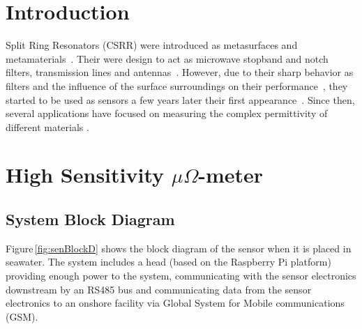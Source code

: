 \documentclass[journal,twoside,web]{ieeecolor}
\begin{document}
\maketitle

\section{Introduction}
\label{sec:intro}
 Split Ring Resonators (CSRR) were introduced as metasurfaces and metamaterials~\cite{falcone2004, Baena2005}. Their were design to act as microwave stopband and notch filters, transmission lines and antennas~\cite{GGarcia2005, Bonache2006, Mandal2006, Gil2007, Velez2008, Zhang2009}. However, due to their sharp behavior as filters and the influence of the surface surroundings on their performance~\cite{Grzegorczyk2005, Stevanovic2006, Bonache2006}, they started to be used as sensors a few years later their first appearance~\cite{Boybay2012, Song2013, Lee2014, Lee2014_2, Ansari2015, Standaert2017, Su2019}. Since then, several applications have focused on measuring the complex permittivity of different materials \cite{} .

\section{High Sensitivity $\mu\Omega$-meter}
\label{sec:corrsens}
\subsection{System Block Diagram}
\label{ssec:sysBlockD}
Figure\,\ref{fig:senBlockD} shows the block diagram of the sensor when it is placed in seawater. The system includes a head (based on the Raspberry Pi platform) providing enough power to the system, communicating with the sensor electronics downstream by an RS485 bus and communicating data from the sensor electronics to an onshore facility via Global System for Mobile communications (GSM).
\end{document}
